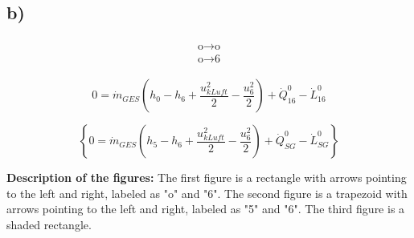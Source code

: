 

\subsection*{b)}

\[
\begin{array}{c}
\begin{array}{c}
\text{o} \rightarrow \text{o} \\
\text{o} \rightarrow \text{6}
\end{array}
\end{array}
\]

\[
0 = \dot{m}_{GES} \left( h_0 - h_6 + \frac{u_{kLuft}^2}{2} - \frac{u_6^2}{2} \right) + \dot{Q}_{16}^0 - \dot{L}_{16}^0
\]

\[
\left\{
0 = \dot{m}_{GES} \left( h_5 - h_6 + \frac{u_{kLuft}^2}{2} - \frac{u_6^2}{2} \right) + \dot{Q}_{SG}^0 - \dot{L}_{SG}^0
\right\}
\]

\noindent
\textbf{Description of the figures:} The first figure is a rectangle with arrows pointing to the left and right, labeled as "o" and "6". The second figure is a trapezoid with arrows pointing to the left and right, labeled as "5" and "6". The third figure is a shaded rectangle.